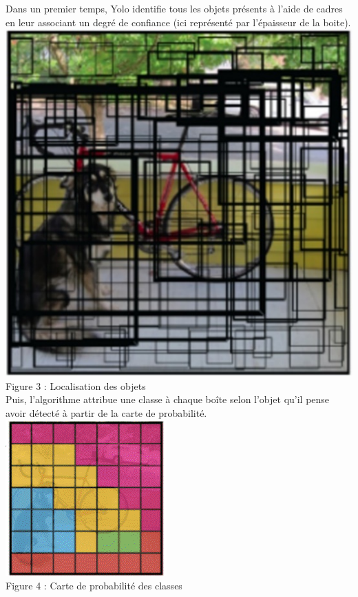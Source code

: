 \documentclass[a4paper, 13px]{article}
\begin{document}
Dans un premier temps, Yolo identifie tous les objets présents à l’aide de cadres en leur associant un degré de confiance (ici représenté par l’épaisseur de la boite).
\\
 \includegraphics[scale=0.8]{img4.png}\\
 Figure 3 : Localisation des objets\\
 
Puis, l’algorithme attribue une classe à chaque boîte selon l’objet qu’il pense avoir détecté à partir de la carte de probabilité.\\
 \includegraphics[scale=0.8]{img5.png}\\
 Figure 4 : Carte de probabilité des classes \\
 
\end{document}
